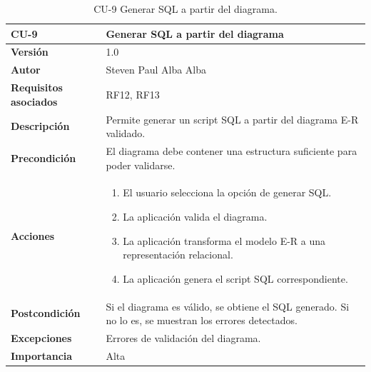 \begin{table}[p]
\centering
\begin{tabularx}{\linewidth}{ p{} p{} }
\toprule
\textbf{CU-9} & \textbf{Generar SQL a partir del diagrama}\\
\toprule
\textbf{Versión} & 1.0 \\
\textbf{Autor} & Steven Paul Alba Alba \\
\textbf{Requisitos asociados} & RF12, RF13 \\
\textbf{Descripción} & Permite generar un script SQL a partir del diagrama E-R validado. \\
\textbf{Precondición} & El diagrama debe contener una estructura suficiente para poder validarse. \\
\textbf{Acciones} &
\begin{enumerate}
\def\labelenumi{\arabic{enumi}.}
\tightlist
\item El usuario selecciona la opción de generar SQL.
\item La aplicación valida el diagrama.
\item La aplicación transforma el modelo E-R a una representación relacional.
\item La aplicación genera el script SQL correspondiente.
\end{enumerate}\\
\textbf{Postcondición} & Si el diagrama es válido, se obtiene el SQL generado. Si no lo es, se muestran los errores detectados. \\
\textbf{Excepciones} & Errores de validación del diagrama. \\
\textbf{Importancia} & Alta \\
\bottomrule
\end{tabularx}
\caption{CU-9 Generar SQL a partir del diagrama.}
\end{table}

